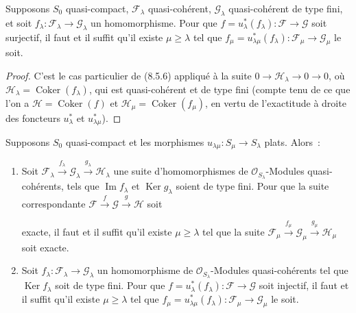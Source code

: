 \begin{corollary}[8.5.7]
\label{IV.8.5.7-fr}
Supposons $S_0$ quasi-compact, $\mathcal F_\lambda$ quasi-cohérent,
$\mathcal G_\lambda$ quasi-cohérent de type fini, et soit
$f_\lambda:\mathcal F_\lambda\to\mathcal G_\lambda$ un homomorphisme. Pour que
$f=u_\lambda^*(f_\lambda):\mathcal F\to\mathcal G$ soit surjectif, il faut et
il suffit qu'il existe $\mu\geq\lambda$ tel que
$f_\mu=u_{\lambda\mu}^*(f_\lambda):\mathcal F_\mu\to\mathcal G_\mu$ le soit.
\end{corollary}

\begin{proof}
C'est le cas particulier de (8.5.6) appliqué à la suite
$0\to\mathcal H_\lambda\to0\to0$, où
$\mathcal H_\lambda=\operatorname{Coker}(f_\lambda)$, qui est quasi-cohérent et
de type fini (compte tenu de ce que l'on a
$\mathcal H=\operatorname{Coker}(f)$ et
$\mathcal H_\mu=\operatorname{Coker}(f_\mu)$, en vertu de l'exactitude à droite
des foncteurs $u_\lambda^*$ et $u_{\lambda\mu}^*$).
\end{proof}

\begin{corollary}[8.5.8]
Supposons $S_0$ quasi-compact et les morphismes
$u_{\lambda\mu}:S_\mu\to S_\lambda$ plats. Alors~:
\begin{enumerate}[label=(\roman*)]
  \item Soit
  $\mathcal F_\lambda\xrightarrow{f_\lambda}\mathcal G_\lambda
  \xrightarrow{g_\lambda}\mathcal H_\lambda$ une suite d'homomorphismes de
  $\mathcal O_{S_\lambda}$-Modules quasi-cohérents, tels que
  $\operatorname{Im}f_\lambda$ et $\operatorname{Ker}g_\lambda$ soient de type
  fini. Pour que la suite correspondante
  $\mathcal F\xrightarrow{f}\mathcal G\xrightarrow{g}\mathcal H$ soit

  exacte, il faut et il suffit qu'il existe $\mu\geq\lambda$ tel que la suite
  $\mathcal F_\mu\xrightarrow{f_\mu}\mathcal G_\mu
  \xrightarrow{g_\mu}\mathcal H_\mu$ soit exacte.

  \item Soit $f_\lambda:\mathcal F_\lambda\to\mathcal G_\lambda$ un
  homomorphisme de $\mathcal O_{S_\lambda}$-Modules quasi-cohérents tel que
  $\operatorname{Ker}f_\lambda$ soit de type fini. Pour que
  $f=u_\lambda^*(f_\lambda):\mathcal F\to\mathcal G$ soit injectif, il faut et
  il suffit qu'il existe $\mu\geq\lambda$ tel que
  $f_\mu=u_{\lambda\mu}^*(f_\lambda):\mathcal F_\mu\to\mathcal G_\mu$ le soit.
\end{enumerate}
\end{corollary}

